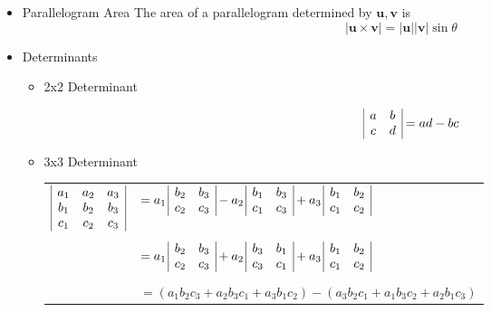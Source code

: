 \documentclass[12pt]{article}
\newcommand{\vect}[1]{\mathbf{#1}}
\newcommand{\<}{\left<}
\renewcommand{\>}{\right>}
\begin{document}
\begin{itemize}
		\item Parallelogram Area
			The area of a parallelogram determined by $\vect{u},\vect{v}$ is \[|\vect{u} \times \vect{v}| = |\vect{u}||\vect{v}|\sin \theta\]
		
		\newpage
		\item Determinants
			\begin{itemize}
			\item 2x2 Determinant
			
			\[
\begin{array}{|c c|}
a & b \\
c & d \\
\end{array}
			= ad - bc
			\]
			
			\item 3x3 Determinant

\begin{center}\begin{tabular}{rl}
	$
		\begin{array}{|c c c|}
		a_1 & a_2 & a_3 \\
		b_1 & b_2 & b_3 \\
		c_1 & c_2 & c_3 \\
		\end{array}
	$
	&
	$
			= a_1 \,
		\begin{array}{|c c|}
		b_2 & b_3 \\
		c_2 & c_3 \\
		\end{array}
			- a_2 \,
		\begin{array}{|c c|}
		b_1 & b_3 \\
		c_1 & c_3 \\
		\end{array}
			+ a_3 \,
		\begin{array}{|c c|}
		b_1 & b_2 \\
		c_1 & c_2 \\
		\end{array}
	$
	\\ [1ex] \\ &
	$
		 = a_1 \,
		\begin{array}{|c c|}
		b_2 & b_3 \\
		c_2 & c_3 \\
		\end{array}
			+ a_2 \,
		\begin{array}{|c c|}
		b_3 & b_1 \\
		c_3 & c_1 \\
		\end{array}
			+ a_3 \,
		\begin{array}{|c c|}
		b_1 & b_2 \\
		c_1 & c_2 \\
		\end{array}
	$
	\\ [1ex] \\ &
	$= (a_1b_2c_3 + a_2b_3c_1 + a_3b_1c_2) - (a_3b_2c_1 + a_1b_3c_2 + a_2b_1c_3)$
\end{tabular}\end{center}
			

\end{itemize}
\end{itemize}
\end{document}

